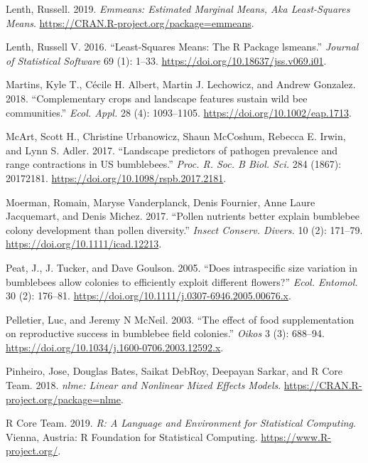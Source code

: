 \documentclass[11pt,]{article}
\begin{document}
\leavevmode\hypertarget{ref-emmeans}{}%
Lenth, Russell. 2019. \emph{Emmeans: Estimated Marginal Means, Aka
Least-Squares Means}. \url{https://CRAN.R-project.org/package=emmeans}.

\leavevmode\hypertarget{ref-lsmeans}{}%
Lenth, Russell V. 2016. ``Least-Squares Means: The R Package lsmeans.''
\emph{Journal of Statistical Software} 69 (1): 1--33.
\url{https://doi.org/10.18637/jss.v069.i01}.

\leavevmode\hypertarget{ref-Martins2018}{}%
Martins, Kyle T., Cécile H. Albert, Martin J. Lechowicz, and Andrew
Gonzalez. 2018. ``Complementary crops and landscape features sustain
wild bee communities.'' \emph{Ecol. Appl.} 28 (4): 1093--1105.
\url{https://doi.org/10.1002/eap.1713}.

\leavevmode\hypertarget{ref-McArt2017}{}%
McArt, Scott H., Christine Urbanowicz, Shaun McCoshum, Rebecca E. Irwin,
and Lynn S. Adler. 2017. ``Landscape predictors of pathogen prevalence
and range contractions in US bumblebees.'' \emph{Proc. R. Soc. B Biol.
Sci.} 284 (1867): 20172181.
\url{https://doi.org/10.1098/rspb.2017.2181}.

\leavevmode\hypertarget{ref-Moerman2017}{}%
Moerman, Romain, Maryse Vanderplanck, Denis Fournier, Anne Laure
Jacquemart, and Denis Michez. 2017. ``Pollen nutrients better explain
bumblebee colony development than pollen diversity.'' \emph{Insect
Conserv. Divers.} 10 (2): 171--79.
\url{https://doi.org/10.1111/icad.12213}.

\leavevmode\hypertarget{ref-Peat2005}{}%
Peat, J., J. Tucker, and Dave Goulson. 2005. ``Does intraspecific size
variation in bumblebees allow colonies to efficiently exploit different
flowers?'' \emph{Ecol. Entomol.} 30 (2): 176--81.
\url{https://doi.org/10.1111/j.0307-6946.2005.00676.x}.

\leavevmode\hypertarget{ref-Pelletier2003}{}%
Pelletier, Luc, and Jeremy N McNeil. 2003. ``The effect of food
supplementation on reproductive success in bumblebee field colonies.''
\emph{Oikos} 3 (3): 688--94.
\url{https://doi.org/10.1034/j.1600-0706.2003.12592.x}.

\leavevmode\hypertarget{ref-nlme}{}%
Pinheiro, Jose, Douglas Bates, Saikat DebRoy, Deepayan Sarkar, and R
Core Team. 2018. \emph{nlme: Linear and Nonlinear Mixed Effects Models}.
\url{https://CRAN.R-project.org/package=nlme}.

\leavevmode\hypertarget{ref-rcite}{}%
R Core Team. 2019. \emph{R: A Language and Environment for Statistical
Computing}. Vienna, Austria: R Foundation for Statistical Computing.
\url{https://www.R-project.org/}.
\end{document}
